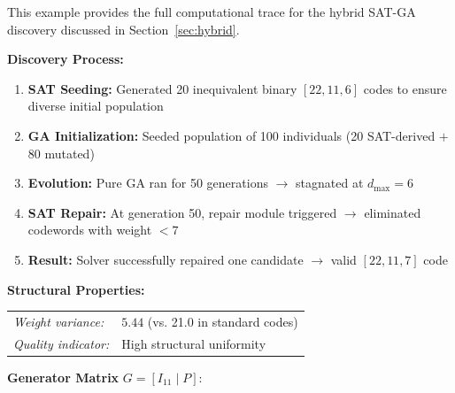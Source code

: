 This example provides the full computational trace for the hybrid SAT-GA discovery discussed in Section~\ref{sec:hybrid}.

\begin{tcolorbox}[enhanced, breakable, colback=white, colframe=black, title={Detailed Analysis: Discovery of {[22,11,7]} Code}]
\textbf{Discovery Process:}
\begin{enumerate}
\item \textbf{SAT Seeding:} Generated 20 inequivalent binary $[22,11,6]$ codes to ensure diverse initial population
\item \textbf{GA Initialization:} Seeded population of 100 individuals (20 SAT-derived $+$ 80 mutated)
\item \textbf{Evolution:} Pure GA ran for 50 generations $\to$ stagnated at $d_{\max} = 6$
\item \textbf{SAT Repair:} At generation 50, repair module triggered $\to$ eliminated codewords with weight $< 7$
\item \textbf{Result:} Solver successfully repaired one candidate $\to$ valid $[22,11,7]$ code
\end{enumerate}

\tcbline

\textbf{Structural Properties:}\\[0.3em]
\begin{tabular}{@{}ll@{}}
\textit{Weight variance:} & $5.44$ (vs. 21.0 in standard codes) \\
\textit{Quality indicator:} & High structural uniformity
\end{tabular}

\tcbline

\textbf{Generator Matrix} $G = [I_{11} \mid P]$:
\begin{center}
\end{center}


\end{tcolorbox}
